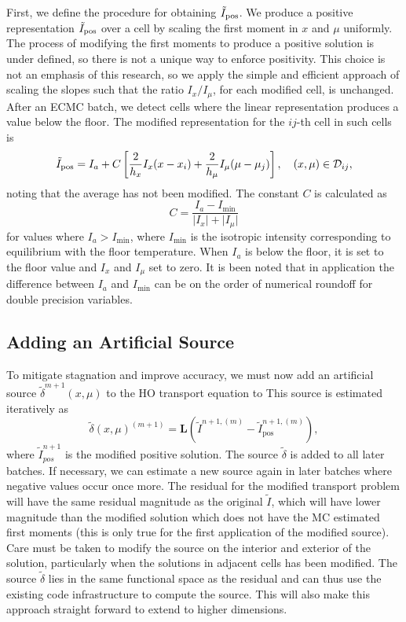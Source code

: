 First, we define the procedure for obtaining $\tilde I_{{\text{pos}}}$. We produce a positive
representation $\tilde I_{\text{{\text{pos}}}}$ over a cell by scaling the first moment
in $x$ and $\mu$ uniformly.  The process of modifying
the first moments to produce a positive solution is under defined, so there is not a unique way to enforce
positivity.  This choice is not an emphasis of this research, so we apply the
simple and efficient approach of scaling the slopes such that the ratio $I_x/I_\mu$, for
each modified cell, is unchanged. 
After an ECMC batch, we detect cells where the linear
representation produces a value below the floor.    The modified representation for the
$ij$-th cell in such cells is
\begin{equation}
    \tilde I_{{\text{pos}}} = I_{a} + C\left[\frac{2}{h_x}I_x(x-x_i) +
    \frac{2}{h_\mu}I_\mu(\mu-\mu_j)\right],\quad     (x,\mu) \in \mathcal{D}_{ij},
\end{equation}
noting that the average has not been modified.
The constant $C$ is calculated as
\begin{equation}
    C =  \frac{I_{a} - I_{\min}}{\lvert I_x \rvert + \lvert I_\mu \rvert}
\end{equation}
for values where $I_{a} > I_{\min}$, where $I_{\min}$ is the isotropic intensity
corresponding to equilibrium with the floor temperature.  When $I_a$ is below the floor, it is set to
the floor value and $I_x$ and $I_\mu$ set to zero.  It is been noted that in application
the difference between $I_{a}$ and $I_{\min}$ can be on the order of numerical roundoff for
double precision variables.

\subsection{Adding an Artificial Source}

To mitigate stagnation and improve accuracy, we must now add an artificial source
$\tilde\delta^{m+1}(x,\mu)$ to the HO transport equation to 
This source is estimated iteratively as
\begin{equation*}
    \tilde\delta(x,\mu)^{(m+1)} = \mathbf{L}(\tilde{I}^{n+1,(m)} -
    \tilde{I}^{n+1,(m)}_{\text{pos}}),
\end{equation*}
where $\tilde{I}_{pos}^{n+1}$ is the modified positive solution. The source $\tilde
\delta$ is added to all later batches.  If necessary, we can estimate a
new source again in later batches where negative values occur once more. The residual for the
modified transport problem will have the same residual magnitude as the original $\tilde
I$, which will have lower magnitude than the modified solution which does not have the MC
estimated first moments (this is only true for the first application of the modified
source).  Care must be
taken to modify the source on the interior and exterior of the solution, particularly when
the solutions in adjacent cells has been modified.  The source
$\tilde\delta$ lies in the same functional space as the residual and can thus use
the existing code infrastructure to compute the source.  This will also make this approach
straight forward to extend to higher dimensions.  


